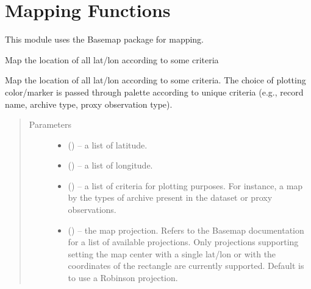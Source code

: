 \documentclass[letterpaper,10pt,english]{sphinxmanual}
\begin{document}
\chapter{Mapping Functions}
\label{\detokenize{Map::doc}}\label{\detokenize{Map:mapping-functions}}
This module uses the Basemap package for mapping.

\begin{fulllineitems}
\label{\detokenize{Map:pyleoclim.Map.mapAll}}
Map the location of all lat/lon according to some criteria

Map the location of all lat/lon according to some criteria. The choice of
plotting color/marker is passed through palette according to unique
criteria (e.g., record name, archive type, proxy observation type).
\begin{quote}\begin{description}
\item[{Parameters}] \leavevmode\begin{itemize}
\item {} 
 () -- a list of latitude.

\item {} 
 () -- a list of longitude.

\item {} 
 () -- a list of criteria for plotting purposes. For instance,
a map by the types of archive present in the dataset or proxy
observations.

\item {} 
 () -- the map projection. Refers to the Basemap
documentation for a list of available projections. Only projections
supporting setting the map center with a single lat/lon or with
the coordinates of the rectangle are currently supported.
Default is to use a Robinson projection.


\end{itemize}
\end{description}
\end{quote}
\end{fulllineitems}
\end{document}
